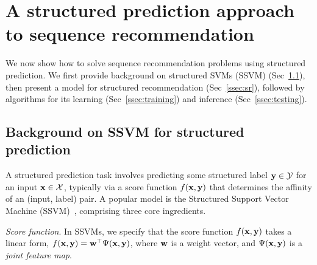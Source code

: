 \secmoveup
\section{A structured prediction approach to sequence recommendation}
\label{sec:recseq}
\textmoveup

We now show how to solve sequence recommendation problems using structured prediction.
We first provide background on structured SVMs (SSVM) (Sec~\ref{ssec:ssvm}),
then present a model for structured recommendation (Sec~\ref{ssec:sr}),
followed by algorithms for its learning (Sec~\ref{ssec:training}) 
and inference (Sec~\ref{ssec:testing}).


\secmoveup
\subsection{Background on SSVM for structured prediction}
\label{ssec:ssvm}
\textmoveup

A structured prediction task involves predicting some structured label $\mathbf{y} \in \mathcal{Y}$ for an input $\mathbf{x} \in \mathcal{X}$,
typically via a score function $f(\mathbf{x},\mathbf{y})$ that determines the affinity of an (input, label) pair.
A popular model is the Structured Support Vector Machine (SSVM)~\cite{joachims2009predicting,tsochantaridis2005large}, comprising three core ingredients.

\emph{Score function}. In SSVMs, we specify that the score function $f(\mathbf{x}, \mathbf{y})$ takes a linear form, \ie 
$f(\mathbf{x}, \mathbf{y}) = \mathbf{w}^\top \Psi(\mathbf{x}, \mathbf{y})$,
where $\mathbf{w}$ is a weight vector, and $\Psi(\mathbf{x}, \mathbf{y})$ is a \emph{joint feature map}.


